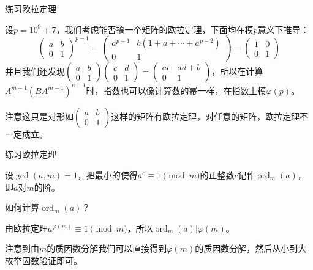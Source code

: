 \documentclass{ctexbeamer}        %
\newcommand{\ord}{\operatorname{ord}}
\begin{document}
\begin{frame}{练习}{欧拉定理}

设$p=10^9+7$，我们考虑能否搞一个矩阵的欧拉定理，下面均在模$p$意义下推导：
$$\begin{pmatrix} a & b \\ 0 & 1 \end{pmatrix}^{p-1}=\begin{pmatrix} a^{p-1} & b(1+a+\cdots+a^{p-2}) \\ 0 & 1 \end{pmatrix}=\begin{pmatrix} 1 & 0 \\ 0 & 1 \end{pmatrix}$$
并且我们还发现$\begin{pmatrix} a & b \\ 0 & 1 \end{pmatrix}\begin{pmatrix} c & d \\ 0 & 1 \end{pmatrix}=\begin{pmatrix} ac & ad+b \\ 0 & 1 \end{pmatrix}$，所以在计算$A^{m-1}(BA^{m-1})^{n-1}$时，指数也可以像计算数的幂一样，在指数上模$\varphi(p)$。

注意这只是对形如$\begin{pmatrix} a & b \\ 0 & 1 \end{pmatrix}$这样的矩阵有欧拉定理，对任意的矩阵，欧拉定理不一定成立。
\end{frame}

\begin{frame}{练习}{欧拉定理}

\begin{example}[计算阶]
	设$\gcd(a,m)=1$，把最小的使得$a^c \equiv 1 \pmod m$的正整数$c$记作$\ord_{m}(a)$，即$a$对$m$的阶。

	如何计算$\ord_{m}(a)$？
\end{example}
\pause
由欧拉定理$a^{\varphi(m)}\equiv 1 \pmod m$，所以$\ord_{m}(a)|\varphi(m)$。

注意到由$m$的质因数分解我们可以直接得到$\varphi(m)$的质因数分解，然后从小到大枚举因数验证即可。

\end{frame}
\end{document}
